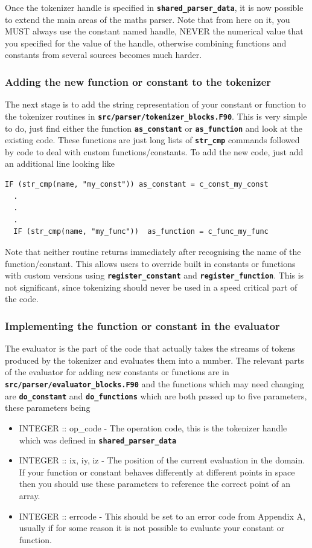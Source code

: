 \documentclass[12pt,a4paper]{article}
\newcommand{\simpleboxverbatim}{\begin{Verbatim}[obeytabs=true,frame=single,
  framerule=0.5mm,rulecolor=\color{warwickmid},formatcom=\color{black}]}
\newcommand{\inlinecode}[1]{{\color{warwickred} \bf\texttt{#1}}}
\begin{document}
Once the tokenizer handle is specified in \inlinecode{shared\_parser\_data}, it
is now possible to extend the main areas of the maths parser. Note that from
here on it, you MUST always use the constant named handle, NEVER the numerical
value that you specified for the value of the handle, otherwise combining
functions and constants from several sources becomes much harder.

\subsubsection{Adding the new function or constant to the tokenizer}
The next stage is to add the string representation of your constant or function
to the tokenizer routines in
\inlinecode{src/parser/tokenizer\_blocks.F90}. This is very simple to do, just
find either the function \inlinecode{as\_constant} or \inlinecode{as\_function} and
look at the existing code. These functions are just long lists of
\inlinecode{str\_cmp} commands followed by code to deal with custom
functions/constants. To add the new code, just add an additional line looking
like
\simpleboxverbatim
  IF (str_cmp(name, "my_const")) as_constant = c_const_my_const
  .
  .
  .
  IF (str_cmp(name, "my_func"))  as_function = c_func_my_func
\end{Verbatim}
Note that neither routine returns immediately after recognising the name of the
function/constant. This allows users to override built in constants or
functions with custom versions using \inlinecode{register\_constant} and
\inlinecode{register\_function}. This is not significant, since tokenizing should
never be used in a speed critical part of the code.

\subsubsection{Implementing the function or constant in the evaluator}
The evaluator is the part of the code that actually takes the streams of tokens
produced by the tokenizer and evaluates them into a number. The relevant parts
of the evaluator for adding new constants or functions are in
\inlinecode{src/parser/evaluator\_blocks.F90} and the functions which may need
changing are \inlinecode{do\_constant} and \inlinecode{do\_functions} which are
both passed up to five parameters, these parameters being
\begin{itemize}
\item INTEGER :: op\_code - The operation code, this is the tokenizer handle
  which was defined in \inlinecode{shared\_parser\_data}
\item INTEGER :: ix, iy, iz - The position of the current evaluation in the
  domain. If your function or constant behaves differently at different points
  in space then you should use these parameters to reference the correct point
  of an array.
\item INTEGER :: errcode - This should be set to an error code from Appendix A,
  usually\linebreak \inlinecode{c\_err\_bad\_value} if for some reason it is not possible to
  evaluate your constant or function.
\end{itemize}
\end{document}
